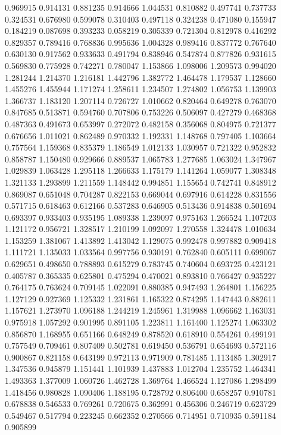 0.969915
0.914131
0.881235
0.914666
1.044531
0.810882
0.497741
0.737733
0.324531
0.676980
0.599078
0.310403
0.497118
0.324238
0.471080
0.155947
0.184219
0.087698
0.393233
0.058219
0.305339
0.721304
0.812978
0.416292
0.829357
0.789416
0.768836
0.995636
1.004328
0.989416
0.837772
0.767640
0.630130
0.917562
0.933633
0.491794
0.838946
0.547874
0.877826
0.931615
0.569830
0.775928
0.742271
0.780047
1.153866
1.098006
1.209573
0.994020
1.281244
1.214370
1.216181
1.442796
1.382772
1.464478
1.179537
1.128660
1.455276
1.455944
1.171274
1.258611
1.234507
1.274802
1.056753
1.139903
1.366737
1.183120
1.207114
0.726727
1.010662
0.820464
0.649278
0.763070
0.847685
0.513871
0.594760
0.707806
0.753226
0.506097
0.427279
0.468368
0.487363
0.491673
0.653997
0.272072
0.482158
0.356068
0.804975
0.721377
0.676656
1.011021
0.862489
0.970332
1.192331
1.148768
0.797405
1.103664
0.757564
1.159368
0.835379
1.186549
1.012133
1.030957
0.721322
0.952832
0.858787
1.150480
0.929666
0.889537
1.065783
1.277685
1.063024
1.347967
1.029839
1.063428
1.295118
1.266633
1.175179
1.141264
1.059077
1.308348
1.321133
1.293899
1.211559
1.148442
0.994851
1.155654
0.742741
0.848912
0.869087
0.651048
0.704287
0.822153
0.669044
0.697916
0.614228
0.831556
0.571715
0.618463
0.612166
0.537283
0.646905
0.513436
0.914838
0.501694
0.693397
0.933403
0.935195
1.089338
1.239097
0.975163
1.266524
1.107203
1.121172
0.956721
1.328517
1.210199
1.092097
1.270558
1.324478
1.010634
1.153259
1.381067
1.413892
1.413042
1.129075
0.992478
0.997882
0.909418
1.111721
1.135033
1.033564
0.997756
0.930191
0.762840
0.605111
0.699067
0.629651
0.498650
0.788893
0.615279
0.783745
0.740604
0.693725
0.423121
0.405787
0.365335
0.625801
0.475294
0.470021
0.893810
0.766427
0.935227
0.764175
0.763624
0.709145
1.022091
0.880385
0.947493
1.264801
1.156225
1.127129
0.927369
1.125332
1.231861
1.165322
0.874295
1.147443
0.882611
1.157621
1.273970
1.096188
1.244219
1.245961
1.319988
1.096662
1.163031
0.975918
1.057292
0.901995
0.891105
1.223811
1.161400
1.125274
1.063302
0.856870
1.168955
0.651166
0.648249
0.878520
0.618910
0.554261
0.499191
0.757549
0.709461
0.807409
0.502781
0.619450
0.536791
0.654693
0.572116
0.900867
0.821158
0.643199
0.972113
0.971909
0.781485
1.113485
1.302917
1.347536
0.945879
1.151441
1.101939
1.437883
1.012704
1.235752
1.464341
1.493363
1.377009
1.060726
1.462728
1.369764
1.466524
1.127086
1.298499
1.418456
0.980828
1.090406
1.188195
0.728792
0.806400
0.658257
0.910781
0.678838
0.546533
0.769261
0.720675
0.362991
0.456306
0.246719
0.623729
0.549467
0.517794
0.223245
0.662352
0.270566
0.714951
0.710935
0.591184
0.905899
